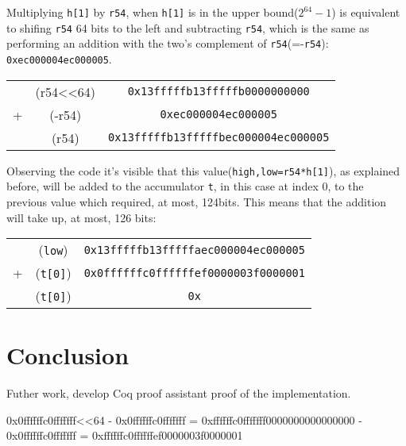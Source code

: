 \documentclass{article}
\begin{document}
Multiplying \texttt{h[1]} by \texttt{r54}, when \texttt{h[1]} is in the upper bound($2^{64}-1$) is equivalent to shifing \texttt{r54} 64 bits to the left and 
subtracting \texttt{r54}, which is the same as performing an addition with the two's complement of \texttt{r54}(=-\texttt{r54}): \texttt{0xec000004ec000005}.
\begin{tabular}{c c c}
    &  (r54<<64)    &\texttt{0x13fffffb13fffffb0000000000} \\
+   &  (-r54)       &\texttt{0xec000004ec000005} \\
\hline
    & (r54)         &\texttt{0x13fffffb13fffffbec000004ec000005} \\
\end{tabular}

Observing the code it's visible that this value(\texttt{high,low=r54*h[1]}), as explained before, will be added to the accumulator \texttt{t}, in this case
at index 0, to the previous value which required, at most, 124bits. This means that the addition will take up, at most, 126 bits:
\begin{tabular}{c c c}
    &  (\texttt{low})        &\texttt{0x13fffffb13fffffaec000004ec000005} \\
+   &  (\texttt{t[0]})       &\texttt{0x0ffffffc0ffffffef0000003f0000001} \\
\hline
    & (\texttt{t[0]})        &\texttt{0x} \\
\end{tabular}


\section{Conclusion}
Futher work, develop Coq proof assistant proof of the implementation.

\printbibliography

\newpage

\begin{appendices}
0x0ffffffc0fffffff<<64 - 0x0ffffffc0fffffff = 0xffffffc0fffffff0000000000000000 - 0x0ffffffc0fffffff = 0xffffffc0ffffffef0000003f0000001
\end{appendices}
\end{document}

